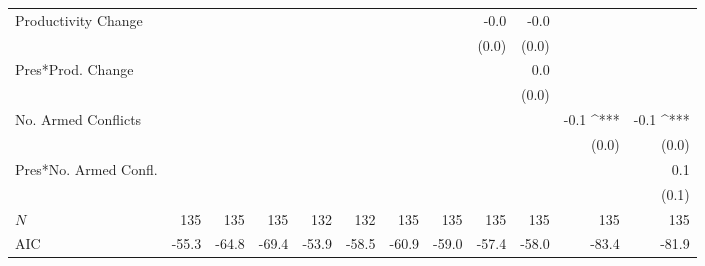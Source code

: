 \documentclass[a4paper]{article}
\begin{document}
\begin{table}[ht]
\begin{center}
{{\begin{tabular}{ l D{.}{.}{1}D{.}{.}{1}D{.}{.}{1}D{.}{.}{1}D{.}{.}{1}D{.}{.}{1}D{.}{.}{1}D{.}{.}{1}D{.}{.}{1}D{.}{.}{1}D{.}{.}{1} }
Productivity Change   &                 &                 &                 &                 &                 &                 &                 & -0.0            & -0.0            &                 &                \\ 
                      &                 &                 &                 &                 &                 &                 &                 & (0.0)           & (0.0)           &                 &                \\ 
Pres*Prod. Change     &                 &                 &                 &                 &                 &                 &                 &                 & 0.0             &                 &                \\ 
                      &                 &                 &                 &                 &                 &                 &                 &                 & (0.0)           &                 &                \\ 
No. Armed Conflicts   &                 &                 &                 &                 &                 &                 &                 &                 &                 & -0.1 ^{***}     & -0.1 ^{***}    \\ 
                      &                 &                 &                 &                 &                 &                 &                 &                 &                 & (0.0)           & (0.0)          \\ 
Pres*No. Armed Confl. &                 &                 &                 &                 &                 &                 &                 &                 &                 &                 & 0.1            \\ 
                      &                 &                 &                 &                 &                 &                 &                 &                 &                 &                 & (0.1)           \\
 $N$                   & 135             & 135             & 135             & 132             & 132             & 135             & 135             & 135             & 135             & 135             & 135            \\ 
AIC                   & -55.3           & -64.8           & -69.4           & -53.9           & -58.5           & -60.9           & -59.0           & -57.4           & -58.0           & -83.4           & -81.9          \\ 

\end{tabular}}}
\end{center}
\end{table}
\end{document}
